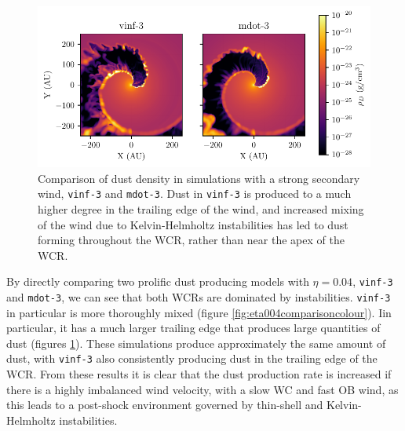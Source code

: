 \begin{figure}
  \centering
  \includegraphics{assets/results/mixed/eta-004-comparison-rhod.pdf}
  \caption[]{Comparison of dust density in simulations with a strong secondary wind, \texttt{vinf-3} and \texttt{mdot-3}. Dust in \texttt{vinf-3} is produced to a much higher degree in the trailing edge of the wind, and increased mixing of the wind due to Kelvin-Helmholtz instabilities has led to dust forming throughout the WCR, rather than near the apex of the WCR.}
  \label{fig:eta004comparisonrhod}
\end{figure}

By directly comparing two prolific dust producing models with $\eta = 0.04$, \texttt{vinf-3} and \texttt{mdot-3}, we can see that both WCRs are dominated by instabilities.
\texttt{vinf-3} in particular is more thoroughly mixed (figure \ref{fig:eta004comparisoncolour}).
Iin particular, it has a much larger trailing edge that produces large quantities of dust (figures \ref{fig:eta004comparisonrhod}).
These simulations produce approximately the same amount of dust, with \texttt{vinf-3} also consistently producing dust in the trailing edge of the WCR.
From these results it is clear that the dust production rate is increased if there is a highly imbalanced wind velocity, with a slow WC and fast OB wind, as this leads to a post-shock environment governed by thin-shell and Kelvin-Helmholtz instabilities.



